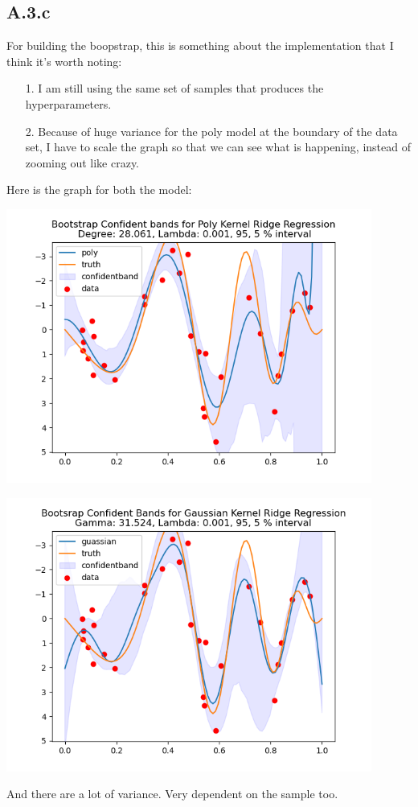 \documentclass[]{article}
\begin{document}
    \subsection*{A.3.c}
        For building the boopstrap, this is something about the implementation that I think it's worth noting: 
        \begin{enumerate}
            \item [1.] I am still using the same set of samples that produces the hyperparameters. 
            \item [2.] Because of huge variance for the poly model at the boundary of the data set, I have to scale the graph so that we can see what is happening, instead of zooming out like crazy. 
        \end{enumerate}
        Here is the graph for both the model: 
        \begin{center}
            \includegraphics*[width=12cm]{Poly-boopstraped.png}
        \end{center}
        \begin{center}
            \includegraphics*[width=12cm]{gaussian-boopstraped.png}
        \end{center}
        And there are a lot of variance. Very dependent on the sample too. 
\end{document}
